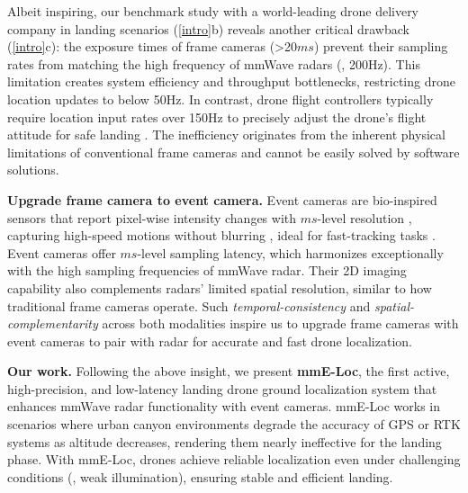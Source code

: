 Albeit inspiring, our benchmark study with a world-leading drone delivery company in landing scenarios (\fig \ref{intro}b) reveals another critical drawback (\fig \ref{intro}c): the exposure times of frame cameras (>20$ms$) prevent their sampling rates from matching the high frequency of mmWave radars (\eg, 200Hz). 
This limitation creates system efficiency and throughput bottlenecks, restricting drone location updates to below 50Hz.
In contrast, drone flight controllers typically require location input rates over 150Hz to precisely adjust the drone's flight attitude for safe landing \cite{8412592, 10.1145/3570361.3592532}.
The inefficiency originates from the inherent physical limitations of conventional frame cameras and cannot be easily solved by software solutions.


\noindent \textbf{Upgrade frame camera to event camera.}
Event cameras are bio-inspired sensors that report pixel-wise intensity changes with $ms$-level resolution \cite{gallego2020event, ruan2024distill}, capturing high-speed motions without blurring \cite{he2024microsaccade}, ideal for fast-tracking tasks \cite{xu2023taming, luo2024eventtracker}.
Event cameras offer $ms$-level sampling latency, which harmonizes exceptionally with the high sampling frequencies of mmWave radar.
Their 2D imaging capability also complements radars' limited spatial resolution, similar to how traditional frame cameras operate.
Such \textit{temporal-consistency} and \textit{spatial-complementarity} across both modalities inspire us to upgrade frame cameras with event cameras to pair with radar for accurate and fast drone localization.


\noindent \textbf{Our work.}
Following the above insight, we present \textbf{mmE-Loc}, the first active, high-precision, and low-latency landing drone ground localization system that enhances mmWave radar functionality with event cameras. 
mmE-Loc works in scenarios where urban canyon environments degrade the accuracy of GPS or RTK systems as altitude decreases, rendering them nearly ineffective for the landing phase. 
With mmE-Loc, drones achieve reliable localization even under challenging conditions (\eg, weak illumination), ensuring stable and efficient landing.

